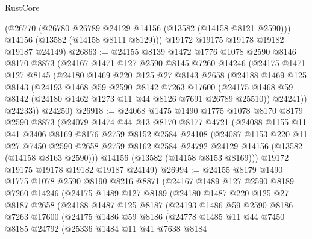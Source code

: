 \begin{lexlean}{RustCore}
\begin{coremodule}
      (@26770
        (@26780 @26789 @24129 @14156 (@13582 (@14158 @8121 @2590)))
        @14156
        (@13582 (@14158 @8111 @8129)))
      @19172
      @19175
      @19178
      @19182
      @19187
      @24149)
@26863 := @24155
    @8139
    @1472
    @1776
    @1078
    @2590
    @8146
    @8170
    @8873
    (@24167
      @1471
      @127
      @2590
      @8145
      @7260
      @14246
      (@24175
        @1471
        @127
        @8145
        (@24180
          @1469
          @220
          @125
          @27
          @8143
          @2658
          (@24188
            @1469
            @125
            @8143
            (@24193
              @1468
              @59
              @2590
              @8142
              @7263
              @17600
              (@24175 @1468 @59 @8142 (@24180 @1462 @1273 @11 @44 @8126 @7691 @26789 @25510))
              @24241))
          @24233))
      @24250)
@26918 := @24068
    @1475
    @1490
    @1775
    @1078
    @8170
    @8179
    @2590
    @8873
    (@24079
      @1474
      @44
      @13
      @8170
      @8177
      @4721
      (@24088
        @1155
        @11
        @41
        @3406
        @8169
        @8176
        @2759
        @8152
        @2584
        @24108
        (@24087
          @1153
          @220
          @11
          @27
          @7450
          @2590
          @2658
          @2759
          @8162
          @2584
          @24792
          @24129
          @14156
          (@13582 (@14158 @8163 @2590)))
        @14156
        (@13582 (@14158 @8153 @8169)))
      @19172
      @19175
      @19178
      @19182
      @19187
      @24149)
@26994 := @24155
    @8179
    @1490
    @1775
    @1078
    @2590
    @8190
    @8216
    @8871
    (@24167
      @1489
      @127
      @2590
      @8189
      @7260
      @14246
      (@24175
        @1489
        @127
        @8189
        (@24180
          @1487
          @220
          @125
          @27
          @8187
          @2658
          (@24188
            @1487
            @125
            @8187
            (@24193
              @1486
              @59
              @2590
              @8186
              @7263
              @17600
              (@24175
                @1486
                @59
                @8186
                (@24778
                  @1485
                  @11
                  @44
                  @7450
                  @8185
                  @24792
                  (@25336
                    @1484
                    @11
                    @41
                    @7638
                    @8184

\end{coremodule}
\end{lexlean}
